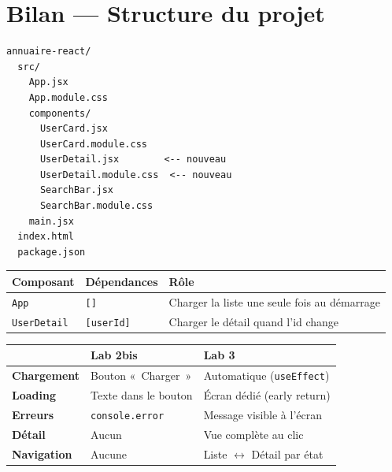 \documentclass[11pt,a4paper]{article}
\begin{document}
\section{Bilan --- Structure du projet}

\begin{lstlisting}[style=terminal]
annuaire-react/
  src/
    App.jsx
    App.module.css
    components/
      UserCard.jsx
      UserCard.module.css
      UserDetail.jsx        <-- nouveau
      UserDetail.module.css  <-- nouveau
      SearchBar.jsx
      SearchBar.module.css
    main.jsx
  index.html
  package.json
\end{lstlisting}

\begin{retenirbox}

\begin{center}
\begin{tabular}{lp{3.5cm}p{5cm}}
\toprule
\textbf{Composant} & \textbf{Dépendances} & \textbf{Rôle} \\
\midrule
\texttt{App} & \texttt{[]} & Charger la liste une seule fois au démarrage \\
\texttt{UserDetail} & \texttt{[userId]} & Charger le détail quand l'id change \\
\bottomrule
\end{tabular}
\end{center}
\end{retenirbox}

\begin{retenirbox}
\begin{center}
\begin{tabular}{lp{4.5cm}p{4.5cm}}
\toprule
& \textbf{Lab 2bis} & \textbf{Lab 3} \\
\midrule
\textbf{Chargement} & Bouton «~Charger~» & Automatique (\texttt{useEffect}) \\
\textbf{Loading} & Texte dans le bouton & Écran dédié (early return) \\
\textbf{Erreurs} & \texttt{console.error} & Message visible à l'écran \\
\textbf{Détail} & Aucun & Vue complète au clic \\
\textbf{Navigation} & Aucune & Liste $\leftrightarrow$ Détail par état \\
\bottomrule
\end{tabular}
\end{center}
\end{retenirbox}
\end{document}
